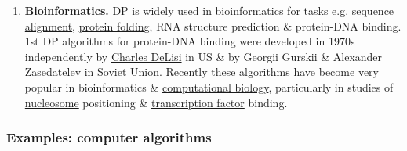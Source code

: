 \documentclass{article}
\begin{document}
\begin{enumerate}
	\item {\bf Bioinformatics.} DP is widely used in bioinformatics for tasks e.g. \href{https://en.wikipedia.org/wiki/Sequence_alignment}{sequence alignment}, \href{https://en.wikipedia.org/wiki/Protein_folding}{protein folding}, RNA structure prediction \& protein-DNA binding. 1st DP algorithms for protein-DNA binding were developed in 1970s independently by \href{https://en.wikipedia.org/wiki/Charles_DeLisi}{\sc Charles DeLisi} in US \& by {\sc Georgii Gurskii \& Alexander Zasedatelev} in Soviet Union. Recently these algorithms have become very popular in bioinformatics \& \href{https://en.wikipedia.org/wiki/Computational_biology}{computational biology}, particularly in studies of \href{https://en.wikipedia.org/wiki/Nucleosome}{nucleosome} positioning \& \href{https://en.wikipedia.org/wiki/Transcription_factor}{transcription factor} binding.
\end{enumerate}

\subsubsection{Examples: computer algorithms}
\end{document}
